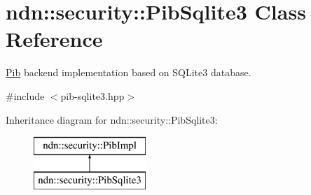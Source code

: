 \hypertarget{classndn_1_1security_1_1PibSqlite3}{}\section{ndn\+:\+:security\+:\+:Pib\+Sqlite3 Class Reference}
\label{classndn_1_1security_1_1PibSqlite3}


\hyperlink{classndn_1_1security_1_1Pib}{Pib} backend implementation based on S\+Q\+Lite3 database.  




{\ttfamily \#include $<$pib-\/sqlite3.\+hpp$>$}

Inheritance diagram for ndn\+:\+:security\+:\+:Pib\+Sqlite3\+:\begin{figure}[H]
\begin{center}
\leavevmode
\includegraphics[height=2.000000cm]{classndn_1_1security_1_1PibSqlite3}
\end{center}
\end{figure}
